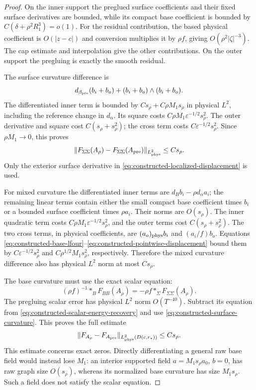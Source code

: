 \documentclass[11pt]{amsart}
\theoremstyle{definition}
\theoremstyle{remark}
\theoremstyle{plain}
\begin{document}
\begin{proof}
On the inner support the preglued surface coefficients and their fixed
surface derivatives are bounded, while its compact base coefficient is
bounded by $C(\delta+\rho^2R_1^3)=o(1)$. For the residual contribution,
the based physical coefficient is $O(|z-c|)$ and conversion multiplies
it by $\rho f$, giving $O(\rho^2|\zeta|^{-3})$. The cap estimate and
interpolation give the other contributions. On the outer support the
pregluing is exactly the smooth residual.

The surface curvature difference is
\[
 d_{\beta_{\rm pre}}(b_i+b_o)+(b_i+b_o)\wedge(b_i+b_o).
\]
The differentiated inner term is bounded by $Cs_\rho+C\rho M_1s_\rho$
in physical $L^2$, including the reference change in $d_\alpha$.
Its square costs $C\rho M_1\varepsilon^{-1/2}s_\rho^2$. The outer
derivative and square cost $C(s_\rho+s_\rho^2)$; the cross term costs
$C\varepsilon^{-1/2}s_\rho^2$. Since $\rho M_1\to0$, this proves
\begin{equation}\label{eq:constructed-surface-curvature}
 \|F_{\Sigma\Sigma}(A_\rho)
          -F_{\Sigma\Sigma}(A_{\rm pre})\|_{L^2_{\rm phys}}
                                                        \leq Cs_\rho.
\end{equation}
Only the exterior surface derivative in
\eqref{eq:constructed-localized-displacement} is used.

For mixed curvature the differentiated inner terms are
$d_Bb_i-\rho d_\alpha a_i$; the remaining linear terms contain either
the small compact base coefficient times $b_i$ or a bounded surface
coefficient times $\rho a_i$. Their norms are $O(s_\rho)$.
The inner quadratic term costs
$C\rho M_1\varepsilon^{-1/2}s_\rho^2$, and the outer terms cost
$C(s_\rho+s_\rho^2)$. The two cross terms, in physical coefficients,
are $(a_o)_{\rm phys}b_i$ and $(a_i/f)b_o$. Equations
\eqref{eq:constructed-base-lfour}--\eqref{eq:constructed-pointwise-displacement}
bound them by $C\varepsilon^{-1/2}s_\rho^2$ and
$C\rho^{1/2}M_1s_\rho^2$, respectively. Therefore the mixed curvature
difference also has physical $L^2$ norm at most $Cs_\rho$.

The base curvature must use the exact scalar equation:
\begin{equation}\label{eq:constructed-scalar-energy-recovery}
 (\rho f)^{-1}*_BF_{BB}(A_\rho)
                    =-\rho f *_\Sigma F_{\Sigma\Sigma}(A_\rho).
\end{equation}
The pregluing scalar error has physical $L^2$ norm $O(T^{-40})$.
Subtract its equation from
\eqref{eq:constructed-scalar-energy-recovery} and use
\eqref{eq:constructed-surface-curvature}. This proves the full estimate
\begin{equation}\label{eq:constructed-curvature-comparison}
 \|F_{A_\rho}-F_{A_{\rm pre}}\|_{L^2_{\rm phys}(D(c,r_*))}
                                                        \leq Cs_\rho.
\end{equation}
This estimate concerns exact zeros. Directly differentiating a general
raw base field would instead lose $M_1$: an interior supported field
$a=M_1s_\rho a_0$, $b=0$, has raw graph size $O(s_\rho)$, whereas
its normalized base curvature has size $M_1s_\rho$. Such a field does
not satisfy the scalar equation.


\end{proof}
\end{document}
